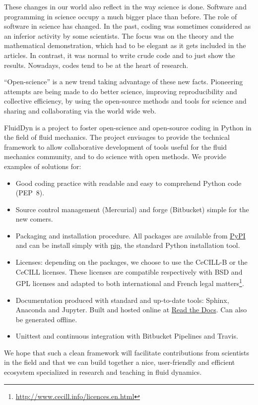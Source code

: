 These changes in our world also reflect in the way science is done.
%
Software and programming in science occupy a much bigger place than before.
%
%
The role of software in science has changed. In the past, coding was sometimes
considered as an inferior activity by some scientists.  The focus was on the
theory and the mathematical demonstration, which had to be elegant as it gets
included in the articles.  In contrast, it was normal to write crude code and to
just show the results. Nowadays, codes tend to be at the heart of research.

``Open-science'' is a new trend taking advantage of these new facts.  Pioneering
attempts are being made to do better science, improving reproducibility and
collective efficiency, by using the open-source methods and tools for science
and sharing and collaborating via the world wide web.


FluidDyn is a project to foster open-science and open-source coding in Python in
the field of fluid mechanics.
%
The project envisages to provide the technical framework to allow collaborative
development of tools useful for the fluid mechanics community, and to do science
with open methods.
%
We provide examples of solutions for:
\begin{itemize}
\item Good coding practice with readable and easy to comprehend Python code
(PEP~8).
\item Source control management (Mercurial) and forge (Bitbucket) simple for
the new comers.
\item Packaging and installation procedure. All packages are available from
\href{https://pypi.org/}{PyPI} and can be install simply with
\href{https://pypi.org/project/pip/}{pip}, the standard Python installation
tool.
\item Licenses: depending on the packages, we choose to use the CeCILL-B or the
CeCILL licenses. These licenses are compatible respectively with BSD and GPL
licenses and adapted to both international and French legal
matters\footnote{\url{http://www.cecill.info/licences.en.html}}.
\item Documentation produced with standard and up-to-date tools: Sphinx,
Anaconda and Jupyter. Built and hosted online at
\href{https://readthedocs.org/}{Read the Docs}. Can also be generated offline.
\item Unittest and continuous integration with Bitbucket Pipelines and Travis.
\end{itemize}
We hope that such a clean framework will facilitate contributions from
scientists in the field and that we can build together a nice, user-friendly
and efficient ecosystem specialized in research and teaching in fluid dynamics.



